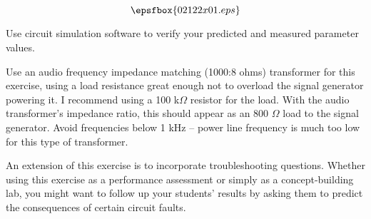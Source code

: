 

$$\epsfbox{02122x01.eps}$$

\vfil \eject






Use circuit simulation software to verify your predicted and measured parameter values.







Use an audio frequency impedance matching (1000:8 ohms) transformer for this exercise, using a load resistance great enough not to overload the signal generator powering it.  I recommend using a 100 k$\Omega$ resistor for the load.  With the audio transformer's impedance ratio, this should appear as an 800 $\Omega$ load to the signal generator.  Avoid frequencies below 1 kHz -- power line frequency is much too low for this type of transformer.

An extension of this exercise is to incorporate troubleshooting questions.  Whether using this exercise as a performance assessment or simply as a concept-building lab, you might want to follow up your students' results by asking them to predict the consequences of certain circuit faults.




